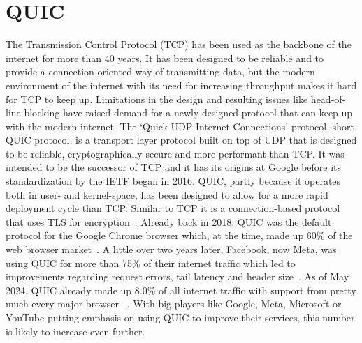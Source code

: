 \section{QUIC}\label{sec:quic_bg}
The Transmission Control Protocol (TCP) has been used as the backbone
of the internet for more than 40 years.
It has been designed to be reliable and to provide a connection-oriented
way of transmitting data, but the modern environment of the internet with
its need for increasing throughput makes it hard for TCP to keep up.
Limitations in the design and resulting issues like head-of-line blocking
have raised demand for a newly designed protocol that can keep up with the
modern internet. %
The `Quick UDP Internet Connections' protocol, short QUIC protocol, is a 
transport layer protocol built on top of UDP that is designed to be reliable, 
cryptographically secure and more performant than TCP\@.
It was intended to be the successor of TCP and it has its origins at Google before 
its standardization by the IETF began in 2016.
QUIC, partly because it operates both in user- and kernel-space, has been designed to allow for a 
more rapid deployment cycle than TCP\@.
Similar to TCP it is a connection-based protocol that uses TLS for encryption~\parencite{quic-explained}.
Already back in 2018, QUIC was the default protocol for the Google Chrome browser which,
at the time, made up 60\% of the web browser market~\parencite{google-quic-usage}.
A little over two years later, Facebook, now Meta, was using QUIC for more than 75\% of 
their internet traffic which led to improvements regarding
request errors, tail latency and header size~\parencite{facebook-quic-usage}.
As of May 2024, QUIC already made up 8.0\% of all internet traffic
with support from pretty much every major browser
~\parencite{internet-quic-usage, article-quic-usage}.
With big players like Google, Meta, Microsoft or YouTube putting emphasis on
using QUIC to improve their services, this number is likely to increase even further.

